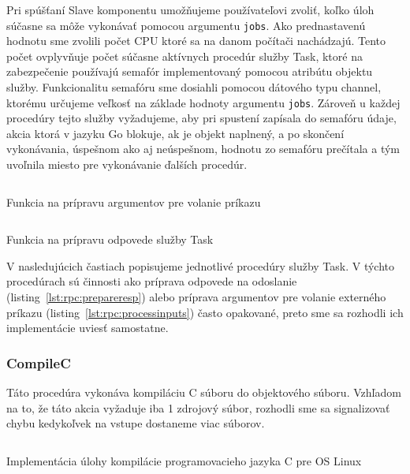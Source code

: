 Pri spúšťaní Slave komponentu umožňujeme používateľovi zvoliť, koľko úloh súčasne sa
môže vykonávať pomocou argumentu \texttt{jobs}. Ako prednastavenú hodnotu sme zvolili počet
CPU ktoré sa na danom počítači nachádzajú. Tento počet ovplyvňuje počet súčasne
aktívnych procedúr služby Task, ktoré na zabezpečenie používajú semafór implementovaný
pomocou atribútu objektu služby. Funkcionalitu semafóru sme dosiahli pomocou
dátového typu channel, ktorému určujeme veľkosť na základe hodnoty argumentu \texttt{jobs}.
Zároveň u každej procedúry tejto služby vyžadujeme, aby pri spustení zapísala do semafóru
údaje, akcia ktorá v jazyku Go blokuje, ak je objekt naplnený, a po skončení vykonávania,
úspešnom ako aj neúspešnom, hodnotu zo semafóru prečítala a tým uvoľnila miesto pre
vykonávanie ďalších procedúr.

\begin{listing}[H]
  \inputminted[frame=lines,framesep=2mm,linenos,fontsize=\scriptsize,firstline=9,lastline=22]{go}{/home/pepol/src/imterra/forge/worker/tasks/util.go}
  \caption{Funkcia na prípravu argumentov pre volanie príkazu}
  \label{lst:rpc:processinputs}
\end{listing}

\begin{listing}[H]
  \inputminted[frame=lines,framesep=2mm,linenos,fontsize=\scriptsize,firstline=24,lastline=40]{go}{/home/pepol/src/imterra/forge/worker/tasks/util.go}
  \caption{Funkcia na prípravu odpovede služby Task}
  \label{lst:rpc:prepareresp}
\end{listing}

V nasledujúcich častiach popisujeme jednotlivé procedúry služby Task. V týchto
procedúrach sú činnosti ako príprava odpovede na odoslanie (listing~\ref{lst:rpc:prepareresp})
alebo príprava argumentov pre volanie externého príkazu (listing~\ref{lst:rpc:processinputs})
často opakované, preto sme sa rozhodli ich implementácie uviesť samostatne.

\subsubsection{CompileC}

Táto procedúra vykonáva kompiláciu C súboru do objektového súboru. Vzhľadom na to,
že táto akcia vyžaduje iba 1 zdrojový súbor, rozhodli sme sa signalizovať chybu
kedykoľvek na vstupe dostaneme viac súborov.

\begin{listing}[H]
  \inputminted[frame=lines,framesep=2mm,linenos,fontsize=\scriptsize,firstline=20,lastline=47]{go}{/home/pepol/src/imterra/forge/worker/tasks/tasks.go}
  \caption[Implementácia kompilácie jazyka C]{Implementácia úlohy kompilácie programovacieho jazyka C pre OS Linux}
  \label{lst:rpc:compilec}
\end{listing}

